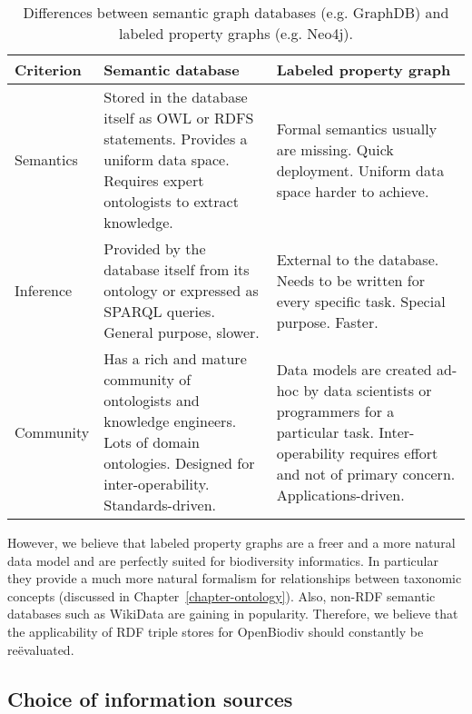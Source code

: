 \begin{table}
\caption{Differences between semantic graph databases (e.g. GraphDB) and labeled property graphs (e.g. Neo4j).}
\begin{tabular}{>{\centering\arraybackslash}m{2.5cm}|>{\centering\arraybackslash}m{4.2cm}|>{\centering\arraybackslash}m{4.2cm}}
Criterion   & Semantic database & Labeled property graph\\
\hline
Semantics   & Stored in the database itself as OWL or RDFS statements. Provides a uniform data space. Requires expert ontologists to extract knowledge.
            & Formal semantics usually are missing. Quick deployment. Uniform data space harder to achieve.\\
\hline
Inference   & Provided by the database itself from its ontology or expressed as SPARQL queries. General purpose, slower.
            & External to the database. Needs to be written for every specific task. Special purpose. Faster.\\
\hline
Community   & Has a rich and mature community of ontologists and knowledge engineers. Lots of domain ontologies. Designed for inter-operability. Standards-driven.
            & Data models are created ad-hoc by data scientists or programmers for a particular task. Inter-operability requires effort and not of primary concern. Applications-driven.\\
\hline
\end{tabular}
\label{graphdb-vs-neo4k}
\end{table}

However, we believe that labeled property graphs are a freer and a more natural data model and are perfectly suited for biodiversity informatics. In particular they provide a much more natural formalism for relationships between taxonomic concepts (discussed in Chapter~\ref{chapter-ontology}). Also, non-RDF semantic databases such as \mbox{WikiData} are gaining in popularity. Therefore, we believe that the applicability of RDF triple stores for OpenBiodiv should constantly be re\"evaluated.

\subsection*{Choice of information sources}

